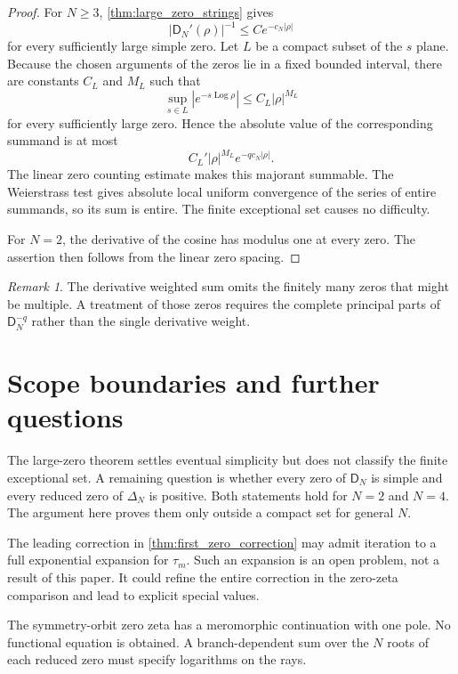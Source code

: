 \documentclass[11pt]{article}
\theoremstyle{definition}
\theoremstyle{remark}
\newtheorem{remark}[remark]{Remark}
\newcommand{\Dfun}{\mathsf D}
\newcommand{\Log}{\operatorname{Log}}
\begin{document}
\begin{proof}
For $N\geq3$, \cref{thm:large_zero_strings} gives
\[
|\Dfun_N'(\rho)|^{-1}
\leq
C e^{-c_N|\rho|}
\]
for every sufficiently large simple zero.  Let $L$ be a compact subset
of the $s$ plane.  Because the chosen arguments of the zeros lie in a
fixed bounded interval, there are constants $C_L$ and $M_L$ such that
\[
\sup_{s\in L}|e^{-s\Log\rho}|
\leq C_L|\rho|^{M_L}
\]
for every sufficiently large zero.  Hence the absolute value of the
corresponding summand is at most
\[
C_L'|\rho|^{M_L}e^{-q c_N|\rho|}.
\]
The linear zero counting estimate makes this majorant summable.  The
Weierstrass test gives absolute local uniform convergence of the
series of entire summands, so its sum is entire.  The finite exceptional
set causes no difficulty.

For $N=2$, the derivative of the cosine has modulus one at every zero.  The assertion then follows from the linear zero spacing.
\end{proof}

\begin{remark}\label{rem:multiple_zeros}
The derivative weighted sum omits the finitely many zeros that might be multiple.  A treatment of those zeros requires the complete principal parts of $\Dfun_N^{-q}$ rather than the single derivative weight.
\end{remark}

\section{Scope boundaries and further questions}\label{sec:further_questions}

The large-zero theorem settles eventual simplicity but does not classify the
finite exceptional set. A remaining question is whether every zero of
$\Dfun_N$ is simple and every reduced zero of $\Delta_N$ is positive. Both
statements hold for $N=2$ and $N=4$. The argument here proves them only outside
a compact set for general $N$.

The leading correction in \cref{thm:first_zero_correction} may admit iteration
to a full exponential expansion for $\tau_m$. Such an expansion is an open
problem, not a result of this paper. It could refine the entire correction in
the zero-zeta comparison and lead to explicit special values.

The symmetry-orbit zero zeta has a meromorphic continuation with one pole. No
functional equation is obtained. A branch-dependent sum over the $N$ roots of
each reduced zero must specify logarithms on the rays.
\end{document}
